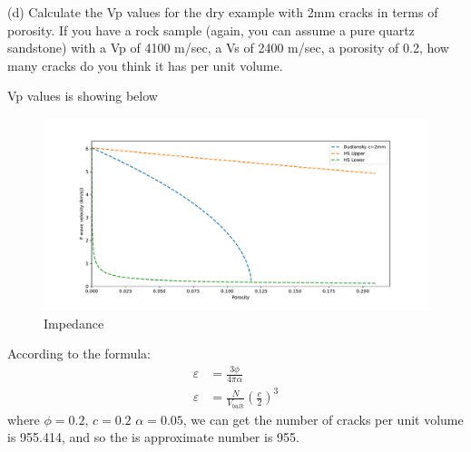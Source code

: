 \begin{problem}{(d)}
    Calculate the Vp values for the dry example with 2mm cracks in terms of porosity. If you have a rock sample (again, you can assume a pure quartz sandstone) with a Vp of 4100 m/sec, a Vs of 2400 m/sec, a porosity of 0.2, how many cracks do you think it has per unit volume.
\end{problem}
\begin{solution}
    Vp values is showing below
    \begin{figure}[H]
        \centering
        \includegraphics[width=1\textwidth]{figures/homework-2/p2-d.pdf}
        \caption{Impedance}
        \label{fig:p2-d}
    \end{figure}

    According to the formula:
    \begin{align}
        \varepsilon  & = \frac{3\phi }{4\pi \alpha }  \\
        \varepsilon  & = \frac{N }{V_{bulk} } (\frac{c}{2})^3
        \label{equ:varepsilon}
    \end{align}
    where $\phi = 0.2$, $c=0.2$  $\alpha=0.05$, we can get the number of cracks per unit volume 
    is 955.414, and so the is approximate number is 955.
\end{solution}




